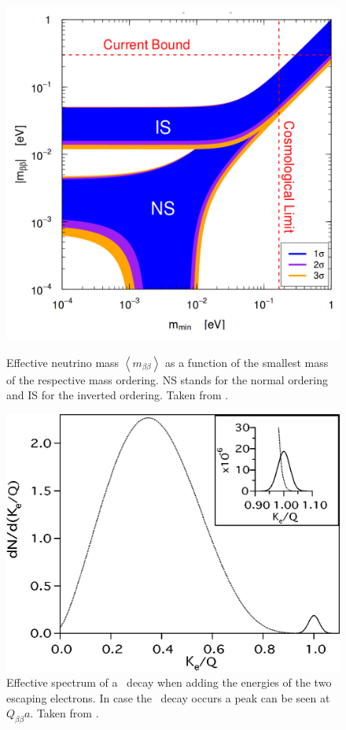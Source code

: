 \documentclass[encoding=utf8,british]{tumphthesis}
\begin{document}
\begin{figure}[t!]
	\centering
	\begin{minipage}[t]{.475\textwidth}
		\centering
		\includegraphics[width=.825\textwidth]{./Bilder/NeutrinoMassOrdering.png}
		\caption{Effective neutrino mass $\left\langle m_{\beta\beta}\right\rangle$ as a function of the smallest mass of the respective mass ordering. NS stands for the normal ordering and IS for the inverted ordering. Taken from \cite{bilenky_neutrinoless_2012}.}
		\label{fig:MassOrder}
	\end{minipage}\hfill%
	\begin{minipage}[t]{.475\textwidth}
		\centering
		\includegraphics[width=\textwidth]{./Bilder/TheoretischesSpektrmdes0nubbDecay.png}
		\caption{Effective spectrum of a \twonu\ decay when adding the energies of the two escaping electrons. In case the \onbb\ decay occurs a peak can be seen at $Q_{\beta\beta} a $. Taken from \cite{elliott_double_2002}.}
		\label{fig:TheoSpektrum}
	\end{minipage}
\end{figure}
\end{document}
